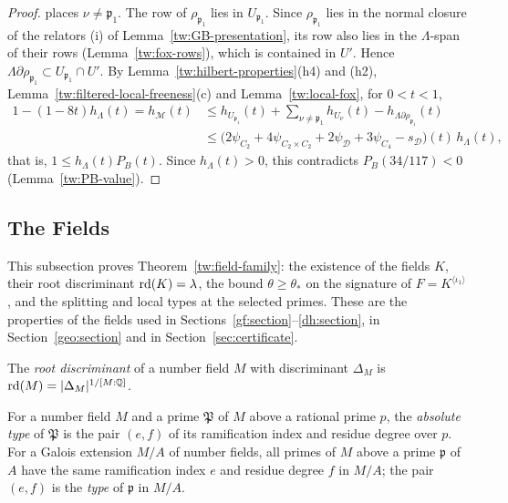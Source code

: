 \begin{proof}
places $\nu\ne\mathfrak p_1$. The row of $\rho_{\mathfrak p_1}$ lies in
$U_{\mathfrak p_1}$. Since $\rho_{\mathfrak p_1}$ lies in the normal closure of
the relators (i) of Lemma~\ref{tw:GB-presentation}, its row also lies in the
$\Lambda$-span of their rows (Lemma~\ref{tw:fox-rows}), which is contained in
$U'$. Hence $\Lambda\partial\rho_{\mathfrak p_1}\subset U_{\mathfrak p_1}\cap U'$.
By Lemma~\ref{tw:hilbert-properties}(h4) and (h2),
Lemma~\ref{tw:filtered-local-freeness}(c) and Lemma~\ref{tw:local-fox}, for
$0<t<1$,
\begin{align*}
 1-(1-8t)h_\Lambda(t)=h_{\mathcal M}(t)
 &\le h_{U_{\mathfrak p_1}}(t)+\sum_{\nu\ne\mathfrak p_1}h_{U_\nu}(t)
 -h_{\Lambda\partial\rho_{\mathfrak p_1}}(t)\\
 &\le\bigl(2\psi_{C_2}+4\psi_{C_2\times C_2}+2\psi_{\mathcal D}+3\psi_{C_4}-s_{\mathcal D}\bigr)(t)
 \,h_\Lambda(t),
\end{align*}
that is, $1\le h_\Lambda(t)P_B(t)$. Since $h_\Lambda(t)>0$, this contradicts
$P_B(34/117)<0$ (Lemma~\ref{tw:PB-value}).
\end{proof}

\subsection{The Fields}\label{tw:fields-section}
This subsection proves Theorem~\ref{tw:field-family}: the existence of the
fields $K$, their root discriminant $\operatorname{rd}(K)=\lambda$, the bound
$\theta\ge\theta_*$ on the signature of $F=K^{\langle\iota_1\rangle}$, and
the splitting and local types at the selected primes. These are the
properties of the fields used in
Sections~\ref{gf:section}--\ref{dh:section}, in Section~\ref{geo:section} and
in Section~\ref{sec:certificate}.

\begin{definition}\label{tw:rd}
The \emph{root discriminant} of a number field $M$ with discriminant
$\Delta_M$ is $\operatorname{rd}(M)=|\Delta_M|^{1/[M:\mathbb Q]}$.
\end{definition}

\begin{definition}\label{tw:type}
For a number field $M$ and a prime $\mathfrak P$ of $M$ above a rational
prime $p$, the \emph{absolute type} of $\mathfrak P$ is the pair $(e,f)$ of
its ramification index and residue degree over $p$. For a Galois extension
$M/A$ of number fields, all primes of $M$ above a prime $\mathfrak p$ of $A$
have the same ramification index $e$ and residue degree $f$ in $M/A$; the
pair $(e,f)$ is the \emph{type} of $\mathfrak p$ in $M/A$.
\end{definition}

